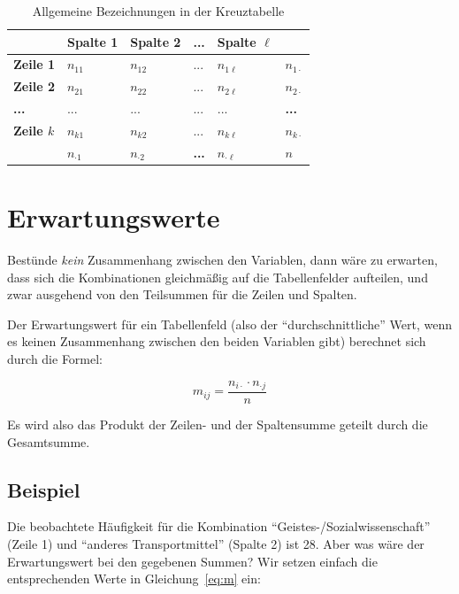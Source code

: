 \documentclass[
  11pt,
  ngerman,
  a4paper,
]{report}
\begin{document}
\begin{table}

\caption{\label{tab:crossalg}Allgemeine Bezeichnungen in der Kreuztabelle}
\centering
\begin{tabular}[t]{>{}l|lll>{}l|>{}l}
\toprule
\textbf{ } & \textbf{Spalte 1} & \textbf{Spalte 2} & \textbf{...} & \textbf{Spalte $\ell$} & \textbf{  }\\
\midrule
\textbf{Zeile 1} & $n_{11}$ & $n_{12}$ & ... & $n_{1\ell}$ & \textbf{$n_{1\cdot}$}\\
\textbf{Zeile 2} & $n_{21}$ & $n_{22}$ & ... & $n_{2\ell}$ & \textbf{$n_{2\cdot}$}\\
\textbf{...} & ... & ... & ... & ... & \textbf{...}\\
\textbf{Zeile $k$} & $n_{k1}$ & $n_{k2}$ & ... & $n_{k\ell}$ & \textbf{$n_{k\cdot}$}\\
\midrule
\textbf{\textbf{}} & \textbf{$n_{\cdot1}$} & \textbf{$n_{\cdot2}$} & \textbf{...} & \textbf{$n_{\cdot\ell}$} & \textbf{\textbf{$n$}}\\
\bottomrule
\end{tabular}
\end{table}

\hypertarget{erwartungswerte}{%
\section{Erwartungswerte}\label{erwartungswerte}}

Bestünde \emph{kein} Zusammenhang zwischen den Variablen, dann wäre zu erwarten, dass sich die Kombinationen gleichmäßig auf die Tabellenfelder aufteilen, und zwar ausgehend von den Teilsummen für die Zeilen und Spalten.

Der Erwartungswert für ein Tabellenfeld (also der \enquote{durchschnittliche} Wert, wenn es keinen Zusammenhang zwischen den beiden Variablen gibt) berechnet sich durch die Formel:

\nopagebreak

\[
m_{ij}=\frac{n_{i\cdot}\cdot n_{\cdot j}}{n}
\label{eq:m}
\]

Es wird also das Produkt der Zeilen- und der Spaltensumme geteilt durch die Gesamtsumme.

\hypertarget{beispiel-31}{%
\subsection{Beispiel}\label{beispiel-31}}

Die beobachtete Häufigkeit für die Kombination \enquote{Geistes-/Sozialwissenschaft} (Zeile 1) und \enquote{anderes Transportmittel} (Spalte 2) ist 28. Aber was wäre der Erwartungswert bei den gegebenen Summen? Wir setzen einfach die entsprechenden Werte in Gleichung~\eqref{eq:m} ein:
\end{document}
